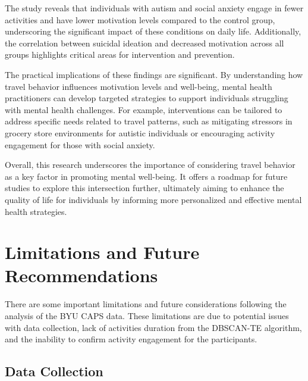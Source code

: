 \documentclass[
  letterpaper,
  number,
  review,
  3p]{elsarticle}
\begin{document}
The study reveals that individuals with autism and social anxiety engage
in fewer activities and have lower motivation levels compared to the
control group, underscoring the significant impact of these conditions
on daily life. Additionally, the correlation between suicidal ideation
and decreased motivation across all groups highlights critical areas for
intervention and prevention.

The practical implications of these findings are significant. By
understanding how travel behavior influences motivation levels and
well-being, mental health practitioners can develop targeted strategies
to support individuals struggling with mental health challenges. For
example, interventions can be tailored to address specific needs related
to travel patterns, such as mitigating stressors in grocery store
environments for autistic individuals or encouraging activity engagement
for those with social anxiety.

Overall, this research underscores the importance of considering travel
behavior as a key factor in promoting mental well-being. It offers a
roadmap for future studies to explore this intersection further,
ultimately aiming to enhance the quality of life for individuals by
informing more personalized and effective mental health strategies.


\section{Limitations and Future
Recommendations}\label{limitations-and-future-recommendations}

There are some important limitations and future considerations following
the analysis of the BYU CAPS data. These limitations are due to
potential issues with data collection, lack of activities duration from
the DBSCAN-TE algorithm, and the inability to confirm activity
engagement for the participants.

\subsection{Data Collection}\label{data-collection}
\end{document}
